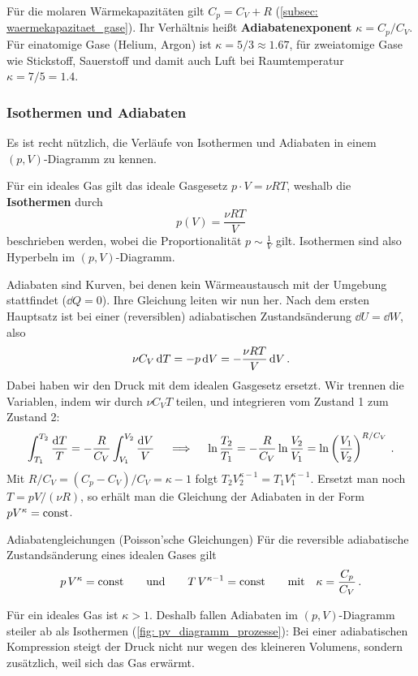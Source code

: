 Für die molaren Wärmekapazitäten gilt $C_p = C_V + R$ (\cref{subsec: waermekapazitaet_gase}). Ihr Verhältnis heißt \textbf{Adiabatenexponent} $\kappa = C_p/C_V$. Für einatomige Gase (Helium, Argon) ist $\kappa = 5/3 \approx \num{1.67}$, für zweiatomige Gase wie Stickstoff, Sauerstoff und damit auch Luft bei Raumtemperatur $\kappa = 7/5 = \num{1.4}$.

\subsubsection{Isothermen und Adiabaten}\label{subsubsec: isothermen_adiabaten}
Es ist recht nützlich, die Verläufe von Isothermen und Adiabaten in einem $(p,V)$-Diagramm zu kennen.

Für ein ideales Gas gilt das ideale Gasgesetz $ p \cdot V = \nu R T $, weshalb die \textbf{Isothermen} durch
\begin{equation}
    p(V) = \frac{\nu R T}{V}
\end{equation}
beschrieben werden, wobei die Proportionalität $ p \sim \frac{1}{V} $ gilt. Isothermen sind also Hyperbeln im $(p,V)$-Diagramm.

Adiabaten sind Kurven, bei denen kein Wärmeaustausch mit der Umgebung stattfindet ($\dd Q=0$). Ihre Gleichung leiten wir nun her. Nach dem ersten Hauptsatz ist bei einer (reversiblen) adiabatischen Zustandsänderung $\dd U = \dd W$, also
\begin{equation*}
    \nu C_V \, \mathrm{d} T = -p \, \mathrm{d} V = -\frac{\nu R T}{V} \, \mathrm{d} V \,.
\end{equation*}
Dabei haben wir den Druck mit dem idealen Gasgesetz ersetzt. Wir trennen die Variablen, indem wir durch $\nu C_V T$ teilen, und integrieren vom Zustand 1 zum Zustand 2:
\begin{equation*}
    \int_{T_1}^{T_2} \frac{\mathrm{d} T}{T} = -\frac{R}{C_V} \int_{V_1}^{V_2} \frac{\mathrm{d} V}{V}
    \quad \implies \quad
    \ln\frac{T_2}{T_1} = -\frac{R}{C_V} \ln\frac{V_2}{V_1} = \ln\left(\frac{V_1}{V_2}\right)^{R/C_V} \,.
\end{equation*}
Mit $R/C_V = (C_p - C_V)/C_V = \kappa - 1$ folgt $T_2 V_2^{\kappa-1} = T_1 V_1^{\kappa-1}$. Ersetzt man noch $T = pV/(\nu R)$, so erhält man die Gleichung der Adiabaten in der Form $pV^\kappa = \mathrm{const}$.

\begin{rememberbox}{Adiabatengleichungen (Poisson'sche Gleichungen)}
    Für die reversible adiabatische Zustandsänderung eines idealen Gases gilt
    \begin{equation}\label{eq: adiabatenbeziehungen}
        p \, V^{\kappa} = \mathrm{const} \qquad \text{und} \qquad T \, V^{\kappa - 1} = \mathrm{const} \qquad \text{mit} \quad \kappa = \frac{C_p}{C_V} \,.
    \end{equation}
\end{rememberbox}
Für ein ideales Gas ist $\kappa > 1$. Deshalb fallen Adiabaten im $(p,V)$-Diagramm steiler ab als Isothermen (\cref{fig: pv_diagramm_prozesse}): Bei einer adiabatischen Kompression steigt der Druck nicht nur wegen des kleineren Volumens, sondern zusätzlich, weil sich das Gas erwärmt.

